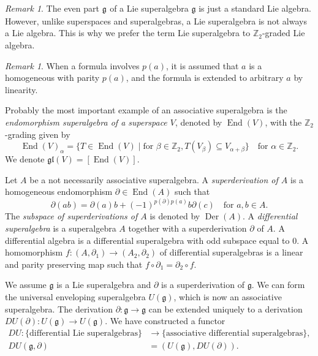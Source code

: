 \documentclass[a4paper, 12pt, reqno]{amsart}
\theoremstyle{remark}
\newtheorem{remark}[theorem]{Remark}
\DeclareMathOperator{\End}{End}
\DeclareMathOperator{\zero}{\overline{0}}
\DeclareMathOperator{\Der}{Der}
\begin{document}
\begin{remark}
  \label{rmk:2}
  The even part $\mathfrak{g}_{\zero}$ of a Lie superalgebra $\mathfrak{g}$ is just a standard Lie algebra.
  However, unlike superspaces and superalgebras, a Lie superalgebra is not always a Lie algebra.
  This is why we prefer the term Lie superalgebra to $\mathbb{Z}_2$-graded Lie algebra.
\end{remark}

\begin{remark}
  \label{rmk:3}
  When a formula involves $p(a)$, it is assumed that $a$ is a homogeneous with parity $p(a)$, and the formula is extended to arbitrary $a$ by linearity.
\end{remark}

Probably the most important example of an associative superalgebra is the \emph{endomorphism superalgebra of a superspace $V$}, denoted by $\End(V)$, with the $\mathbb{Z}_2$-grading given by
\begin{equation*}
  \End(V)_{\alpha} = \{T \in \End(V) \mid \text{for $\beta \in \mathbb{Z}_2, T(V_{\beta}) \subseteq V_{\alpha + \beta}$}\} \quad \text{for $\alpha \in \mathbb{Z}_2$}.
\end{equation*}
We denote $\mathfrak{gl}(V) = [\End(V)]$.

Let $A$ be a not necessarily associative superalgebra.
A \emph{superderivation of $A$} is a homogeneous endomorphism $\partial \in \End(A)$ such that
\begin{equation*}
  \partial(ab) = \partial(a)b + (-1)^{p(\partial)p(a)}b\partial(c) \quad \text{for $a, b \in A$}.
\end{equation*}
The \emph{subspace of superderivations of $A$} is denoted by $\Der(A)$.
A \emph{differential superalgebra} is a superalgebra $A$ together with a superderivation $\partial$ of $A$.
A differential algebra is a differential superalgebra with odd subspace equal to $0$.
A homomorphism $f: (A, \partial_1) \to (A_2, \partial_2)$ of differential superalgebras is a linear and parity preserving map such that $f\circ\partial_1 = \partial_2\circ f$.

We assume $\mathfrak{g}$ is a Lie superalgebra and $\partial$ is a superderivation of $\mathfrak{g}$.
We can form the universal enveloping superalgebra $U(\mathfrak{g})$, which is now an associative superalgebra.
The derivation $\partial: \mathfrak{g} \to \mathfrak{g}$ can be extended uniquely to a derivation $DU(\partial): U(\mathfrak{g}) \to U(\mathfrak{g})$.
We have constructed a functor
\begin{align*}
  DU: \{\text{differential Lie superalgebras}\} &\to \{\text{associative differential superalgebras}\}, \\
  DU(\mathfrak{g}, \partial) &= (U(\mathfrak{g}), DU(\partial)).
\end{align*}
\end{document}
